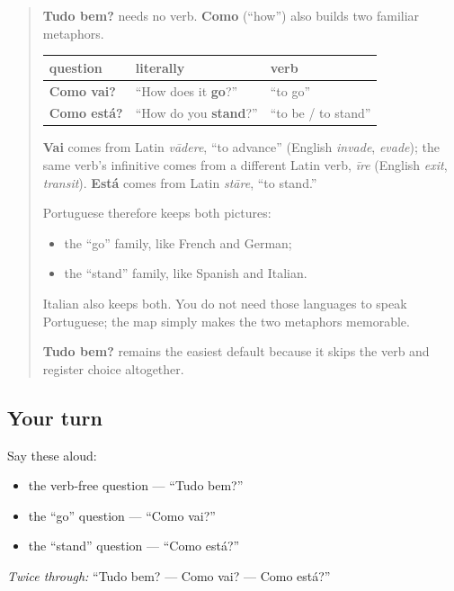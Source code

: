 \begin{quote}
\textbf{Tudo bem?} needs no verb. \textbf{Como} (“how”) also builds two familiar metaphors.

\noindent
\begin{tabularx}{\linewidth}{@{}>{\raggedright\arraybackslash}X>{\raggedright\arraybackslash}X>{\raggedright\arraybackslash}X@{}}
\toprule
\textbf{question} & \textbf{literally} & \textbf{verb} \\
\midrule
\textbf{Como vai?} & “How does it \textbf{go}?” & “to go” \\
\textbf{Como está?} & “How do you \textbf{stand}?” & “to be / to stand” \\
\bottomrule
\end{tabularx}

\textbf{Vai} comes from Latin \emph{vādere}, “to advance” (English \emph{invade}, \emph{evade}); the same verb’s infinitive comes from a different Latin verb, \emph{īre} (English \emph{exit}, \emph{transit}). \textbf{Está} comes from Latin \emph{stāre}, “to stand.”

Portuguese therefore keeps both pictures:

\begin{itemize}
\raggedright
  \item the “go” family, like French and German;
  \item the “stand” family, like Spanish and Italian.
\end{itemize}

Italian also keeps both. You do not need those languages to speak Portuguese; the map simply makes the two metaphors memorable.

\textbf{Tudo bem?} remains the easiest default because it skips the verb and register choice altogether.
\end{quote}

\subsection*{Your turn}
Say these aloud:

\begin{itemize}
\raggedright
  \item the verb-free question — “Tudo bem?”
  \item the “go” question — “Como vai?”
  \item the “stand” question — “Como está?”
\end{itemize}

\emph{Twice through:} “Tudo bem? — Como vai? — Como está?”

